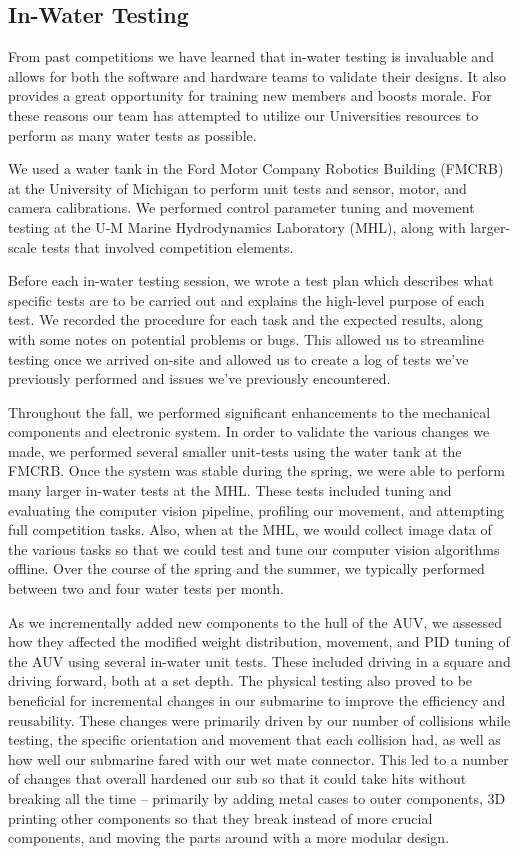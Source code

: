 \documentclass[conference]{IEEEtran}
\begin{document}
\subsection{In-Water Testing}
\label{ssec:in_water_testing}
From past competitions we have learned that in-water testing is invaluable and allows for both the software and hardware teams to validate their designs. It also provides a great opportunity for training new members and boosts morale. For these reasons our team has attempted to utilize our Universities resources to perform as many water tests as possible.

We used a water tank in the Ford Motor Company Robotics Building (FMCRB) at the University of Michigan to perform unit tests and sensor, motor, and camera calibrations. We performed control parameter tuning and movement testing at the U-M Marine Hydrodynamics Laboratory (MHL), along with larger-scale tests that involved competition elements.

Before each in-water testing session, we wrote a test plan which describes what specific tests are to be carried out and explains the high-level purpose of each test. We recorded the procedure for each task and the expected results, along with some notes on potential problems or bugs. This allowed us to streamline testing once we arrived on-site and allowed us to create a log of tests we’ve previously performed and issues we’ve previously encountered. 


Throughout the fall, we performed significant enhancements to the mechanical components and electronic system. In order to validate the various changes we made, we performed several smaller unit-tests using the water tank at the FMCRB. Once the system was stable during the spring, we were able to perform many larger in-water tests at the MHL. These tests included tuning and evaluating the computer vision pipeline, profiling our movement, and attempting full competition tasks. Also, when at the MHL, we would collect image data of the various tasks so that we could test and tune our computer vision algorithms offline. Over the course of the spring and the summer, we typically performed between two and four water tests per month. 

As we incrementally added new components to the hull of the AUV, we assessed how they affected the modified weight distribution, movement, and PID tuning of the AUV using several in-water unit tests. These included driving in a square and driving forward, both at a set depth. The physical testing also proved to be beneficial for incremental changes in our submarine to improve the efficiency and reusability. These changes were primarily driven by our number of collisions while testing, the specific orientation and movement that each collision had, as well as how well our submarine fared with our wet mate connector. This led to a number of changes that overall hardened our sub so that it could take hits without breaking all the time -- primarily by adding metal cases to outer components, 3D printing other components so that they break instead of more crucial components, and moving the parts around with a more modular design.
\end{document}
